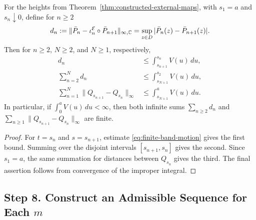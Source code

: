 \begin{proposition}
\label{prop:consecutive-retraction-distances}
For the heights from Theorem~\ref{thm:constructed-external-maps},
with \(s_1=a\) and \(s_n\downarrow0\), define for \(n\ge2\)
\[
 d_n:=
 \|\bar P_n-\iota_n^{\mathcal E}\circ\bar P_{n+1}\|_{\infty,\mathbb C}
 =\sup_{z\in D}|\bar P_n(z)-\bar P_{n+1}(z)|.
\]
Then for \(n\ge2\), \(N\ge2\), and \(N\ge1\), respectively,
\begin{align}
 d_n&\le\int_{s_{n+1}}^{s_n}V(u)\,du,\label{eq:retraction-distance-bound}\\
 \sum_{n=2}^{N}d_n
   &\le\int_{s_{N+1}}^{s_2}V(u)\,du,\label{eq:retraction-distance-sum}\\
 \sum_{n=1}^{N}\|Q_{s_{n+1}}-Q_{s_n}\|_\infty
   &\le\int_{s_{N+1}}^aV(u)\,du.
   \label{eq:retraction-motion-sum}
\end{align}
In particular, if \(\int_0^aV(u)\,du<\infty\), then both infinite sums
\(\sum_{n\ge2}d_n\) and
\(\sum_{n\ge1}\|Q_{s_{n+1}}-Q_{s_n}\|_\infty\) are finite.
\end{proposition}
\begin{proof}
For \(t=s_n\) and \(s=s_{n+1}\), estimate
\eqref{eq:finite-band-motion} gives the first bound. Summing over the
disjoint intervals \([s_{n+1},s_n]\) gives the second. Since \(s_1=a\),
the same summation for distances between \(Q_{s_n}\) gives the third.
The final assertion follows from convergence of the improper integral.
\end{proof}

\subsection{Step 8. Construct an Admissible Sequence for Each \(m\)}

